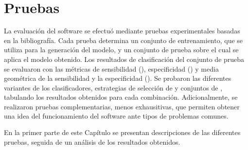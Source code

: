 %
%
%
%
\chapter{Pruebas}
%
La evaluación del software se efectuó mediante pruebas experimentales
basadas en la bibliografía.
Cada prueba determina un conjunto de entrenamiento, que se utiliza
para la generación del modelo, y un conjunto de prueba sobre el cual
se aplica el modelo obtenido.
Los resultados de clasificación del conjunto de prueba se evaluaron
con las métricas de sensibilidad (\SE), especificidad (\SP) y media
geométrica de la sensibilidad y la especificidad (\GM).
Se probaron las diferentes variantes de los clasificadores,
estrategias de selección de  y conjuntos de ,
tabulando los resultados obtenidos para cada combinación.
Adicionalmente, se realizaron pruebas complementarias, menos
exhausitivas, que permiten obtener una idea del funcionamiento del
software ante tipos de problemas comunes.

En la primer parte de este Capítulo se presentan descripciones de
las diferentes pruebas, seguida de un análisis de los resultados
obtenidos.
